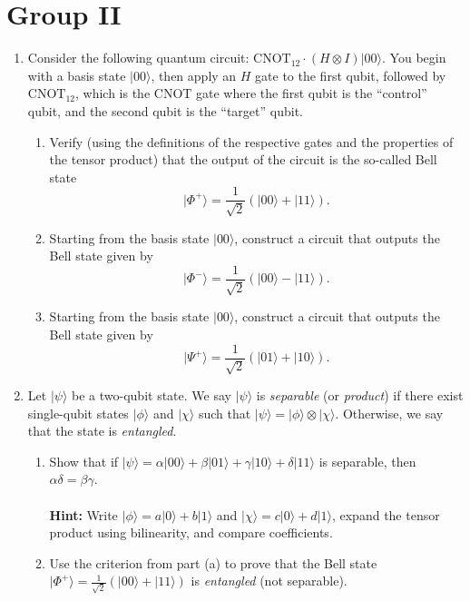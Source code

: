 \documentclass[12pt]{article}
\begin{document}
\section*{Group II}
\begin{enumerate}
\item Consider the following quantum circuit: $\text{CNOT}_{12} \cdot (H \otimes I)|00\rangle$. You begin with a basis state $|00\rangle$, then apply an $H$ gate to the first qubit, followed by $\text{CNOT}_{12}$, which is the CNOT gate where the first qubit is the ``control'' qubit, and the second qubit is the ``target'' qubit. 
\begin{enumerate}
    \item Verify (using the definitions of the respective gates and the properties of the tensor product) that the output of the circuit is the so-called Bell state $$|\Phi^+\rangle=\frac{1}{\sqrt{2}}(|00\rangle + |11\rangle).$$
    \item Starting from the basis state $|00\rangle$, construct a circuit that outputs the Bell state given by $$|\Phi^-\rangle=\frac{1}{\sqrt{2}}(|00\rangle-|11\rangle).$$
    \item Starting from the basis state $|00\rangle$, construct a circuit that outputs the Bell state given by $$|\Psi^+\rangle=\frac{1}{\sqrt{2}}(|01\rangle+|10\rangle).$$
\end{enumerate}
\item Let $|\psi\rangle$ be a two-qubit state. We say $|\psi\rangle$ is \textit{separable} (or \textit{product}) if there exist single-qubit states $|\phi\rangle$ and $|\chi\rangle$ such that $|\psi\rangle = |\phi\rangle \otimes |\chi\rangle$. Otherwise, we say that the state is \textit{entangled}.
\begin{enumerate}
    \item Show that if $|\psi\rangle = \alpha|00\rangle + \beta|01\rangle + \gamma|10\rangle + \delta|11\rangle$ is separable, then $\alpha\delta = \beta\gamma$.
    \\
    \\
    \textbf{Hint:} Write $|\phi\rangle = a|0\rangle + b|1\rangle$ and $|\chi\rangle = c|0\rangle + d|1\rangle$, expand the tensor product using bilinearity, and compare coefficients.
    
    \item Use the criterion from part (a) to prove that the Bell state $|\Phi^+\rangle = \frac{1}{\sqrt{2}}(|00\rangle + |11\rangle)$ is \textit{entangled} (not separable).
\end{enumerate}

\end{enumerate}
\end{document}
